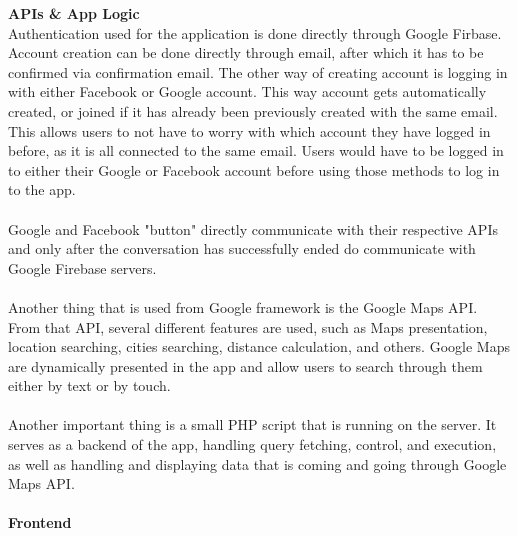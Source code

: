 \textbf{APIs \& App Logic}\\

Authentication used for the application is done directly through Google Firbase. Account creation can be done directly through email, after which it has to be confirmed via confirmation email. The other way of creating account is logging in with either Facebook or Google account. This way account gets automatically created, or joined if it has already been previously created with the same email. This allows users to not have to worry with which account they have logged in before, as it is all connected to the same email. Users would have to be logged in to either their Google or Facebook account before using those methods to log in to the app.\\ \\
Google and Facebook "button" directly communicate with their respective APIs and only after the conversation has successfully ended do communicate with Google Firebase servers. \\ \\
Another thing that is used from Google framework is the Google Maps API. From that API, several different features are used, such as Maps presentation, location searching, cities searching, distance calculation, and others. Google Maps are dynamically presented in the app and allow users to search through them either by text or by touch.\\ \\
Another important thing is a small PHP script that is running on the server. It serves as a backend of the app, handling query fetching, control, and execution, as well as handling and displaying data that is coming and going through Google Maps API.\\ \\ 

\textbf{Frontend}\\

